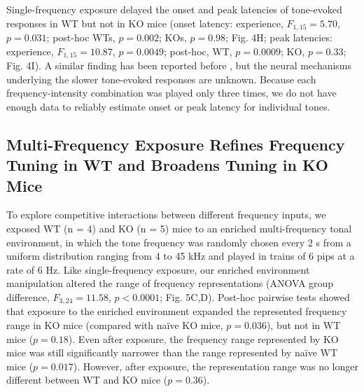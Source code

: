 Single-frequency exposure delayed the onset and peak latencies of tone-evoked responses in WT but not in KO mice (onset latency: experience, $F_{1,15}=5.70$, $p=0.031$; post-hoc WTs, $p=0.002$; KOs, $p=0.98$; Fig. 4H; peak latencies: experience, $F_{1,15}=10.87$, $p=0.0049$; post-hoc, WT, $p=0.0009$; KO, $p=0.33$; Fig. 4I). A similar finding has been reported before \cite{Engineer2004}, but the neural mechanisms underlying the slower tone-evoked responses are unknown. Because each frequency-intensity combination was played only three times, we do not have enough data to reliably estimate onset or peak latency for individual tones.

\subsection{Multi-Frequency Exposure Refines Frequency Tuning in WT and Broadens Tuning in KO Mice}

To explore competitive interactions between different frequency inputs, we exposed WT (n = 4) and KO (n = 5) mice to an enriched multi-frequency tonal environment, in which the tone frequency was randomly chosen every 2 s from a uniform distribution ranging from 4 to 45 kHz and played in trains of 6 pips at a rate of 6 Hz. Like single-frequency exposure, our enriched environment manipulation altered the range of frequency representations (ANOVA group difference, $F_{3,24}=11.58$, $p<0.0001$; Fig. 5C,D). Post-hoc pairwise tests showed that exposure to the enriched environment expanded the represented frequency range in KO mice (compared with na\"ive KO mice, $p=0.036$), but not in WT mice ($p=0.18$). Even after exposure, the frequency range represented by KO mice was still significantly narrower than the range represented by na\"ive WT mice ($p=0.017$). However, after exposure, the representation range was no longer different between WT and KO mice ($p=0.36$).


